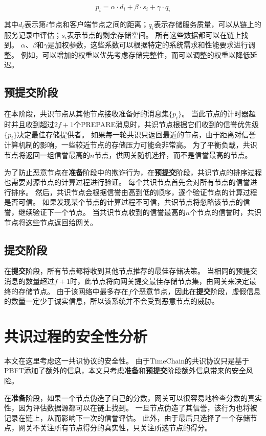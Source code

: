\begin{equation} 
    \label{eq:score}
    p_i=\alpha\cdot d_i+\beta\cdot s_i+\gamma\cdot q_i
\end{equation}

其中$d_i$表示第$i$节点和客户端节点之间的距离；$q_i$表示存储服务质量，可以从链上的服务记录中评估；$s_i$表示节点的剩余存储空间。
所有这些数据都可以在链上找到。
$\alpha$、$\beta$和$\gamma$是加权参数，这些系数可以根据特定的系统需求和性能要求进行调整。
例如，可以增加的权重以优先考虑存储完整性，而可以调整的权重以降低延迟。

\subsection{预提交阶段}
在本阶段，共识节点从其他节点接收准备好的消息集$\{p_i\}$。
当此节点的计时器超时并且收到超过$2f+1$个PREPARE消息时，共识节点根据它们收到的信誉优先级$\{p_i\}$决定最佳存储提供者。
如果每一轮共识只返回最近的节点，由于距离对信誉计算机制的影响，一些较近节点的存储压力可能会非常高。
为了平衡负载，共识节点将返回一组信誉最高的$n$节点，供网关随机选择，而不是信誉最高的节点。

为了防止恶意节点在\textbf{准备}阶段中的欺诈行为，在\textbf{预提交}阶段，共识节点的排序过程也需要对源节点的计算过程进行验证。
每个共识节点首先会对所有节点的信誉进行排序。
然后，共识节点会根据信誉由高到低的顺序，逐个验证节点的计算过程是否可信。
如果发现某个节点的计算过程不可信，共识节点将忽略该节点的信誉，继续验证下一个节点。
当共识节点收到的信誉最高的$n$个节点的信誉时，共识节点将这些节点返回给网关。

\subsection{提交阶段}
在\textbf{提交}阶段，所有节点都将收到其他节点推荐的最佳存储决策。
当相同的预提交消息的数量超过$f+1$时，此节点将向网关提交最佳存储节点集，由网关来决定最终的存储节点。
由于该网络中最多存在$f$个恶意节点，因此在\textbf{提交}阶段，虚假信息的数量一定少于诚实信息，所以该系统并不会受到恶意节点的威胁。

\section{共识过程的安全性分析}
本文在这里考虑这一共识协议的安全性。
由于TimeChain的共识协议只是基于PBFT添加了额外的信息，本文只考虑\textbf{准备}和\textbf{预提交}阶段额外信息带来的安全风险。

在\textbf{准备}阶段，如果一个节点伪造了自己的分数，网关可以很容易地检查分数的真实性，因为评估数据源都可以在链上找到。
一旦节点伪造了其信誉，该行为也将被记录在链上，从而影响下一次的信誉评估。
此外，由于最后只选择了一个存储节点，网关不关注所有节点得分的真实性，只关注所选节点的得分。

